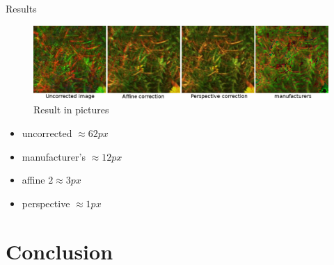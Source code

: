 \documentclass{beamer}
\begin{document}
		\begin{frame}{Results}
			\begin{figure}
				\includegraphics[width=\linewidth]{../figures/merged-correction}
				\caption{Result in pictures}
				\label{fig:affine5}
			\end{figure}
			\begin{multicols}{2}
				\begin{itemize}
					\item uncorrected $\approx 62px$
					\item manufacturer's $\approx 12px$
					\item affine $2 \approx 3px$
					\item perspective $\approx 1px$
				\end{itemize}
			\end{multicols}
		\end{frame}
	
	
	\section{Conclusion}
	
\end{document}
